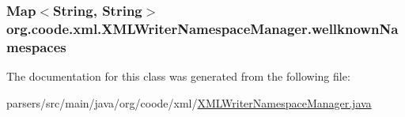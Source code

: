 \hypertarget{classorg_1_1coode_1_1xml_1_1_x_m_l_writer_namespace_manager_aef8ff8e61dfde90b957f474c38fe0b24}{
\subsubsection[{wellknown\-Namespaces}]{\setlength{\rightskip}{0pt plus 5cm}Map$<$String, String$>$ org.\-coode.\-xml.\-X\-M\-L\-Writer\-Namespace\-Manager.\-wellknown\-Namespaces\hspace{0.3cm}{\ttfamily [private]}}}\label{classorg_1_1coode_1_1xml_1_1_x_m_l_writer_namespace_manager_aef8ff8e61dfde90b957f474c38fe0b24}


The documentation for this class was generated from the following file\-:\begin{DoxyCompactItemize}
\item 
parsers/src/main/java/org/coode/xml/\hyperlink{_x_m_l_writer_namespace_manager_8java}{X\-M\-L\-Writer\-Namespace\-Manager.\-java}\end{DoxyCompactItemize}
